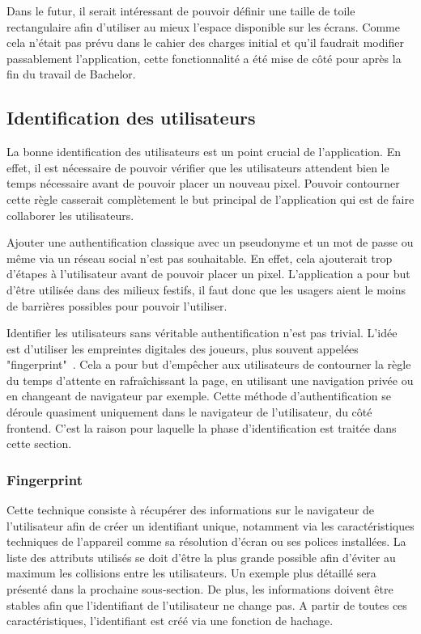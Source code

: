 Dans le futur, il serait intéressant de pouvoir définir une taille de toile rectangulaire afin d'utiliser au mieux l'espace disponible sur les écrans. Comme cela n'était pas prévu dans le cahier des charges initial et qu'il faudrait modifier passablement l'application, cette fonctionnalité a été mise de côté pour après la fin du travail de Bachelor.

\subsection{Identification des utilisateurs}
La bonne identification des utilisateurs est un point crucial de l'application. En effet, il est nécessaire de pouvoir vérifier que les utilisateurs attendent bien le temps nécessaire avant de pouvoir placer un nouveau pixel. Pouvoir contourner cette règle casserait complètement le but principal de l'application qui est de faire collaborer les utilisateurs.

Ajouter une authentification classique avec un pseudonyme et un mot de passe ou même via un réseau social n'est pas souhaitable. En effet, cela ajouterait trop d'étapes à l'utilisateur avant de pouvoir placer un pixel. L'application a pour but d'être utilisée dans des milieux festifs, il faut donc que les usagers aient le moins de barrières possibles pour pouvoir l'utiliser.

Identifier les utilisateurs sans véritable authentification n'est pas trivial. L'idée est d'utiliser les empreintes digitales des joueurs, plus souvent appelées "fingerprint"~\cite{devicefingerprint}. Cela a pour but d'empêcher aux utilisateurs de contourner la règle du temps d'attente en rafraîchissant la page, en utilisant une navigation privée ou en changeant de navigateur par exemple. Cette méthode d'authentification se déroule quasiment uniquement dans le navigateur de l'utilisateur, du côté frontend. C'est la raison pour laquelle la phase d'identification est traitée dans cette section.

\subsubsection{Fingerprint}

Cette technique consiste à récupérer des informations sur le navigateur de l'utilisateur afin de créer un identifiant unique, notamment via les caractéristiques techniques de l'appareil comme sa résolution d'écran ou ses polices installées. La liste des attributs utilisés se doit d'être la plus grande possible afin d'éviter au maximum les collisions entre les utilisateurs. Un exemple plus détaillé sera présenté dans la prochaine sous-section. De plus, les informations doivent être stables afin que l'identifiant de l'utilisateur ne change pas. A partir de toutes ces caractéristiques, l'identifiant est créé via une fonction de hachage.

